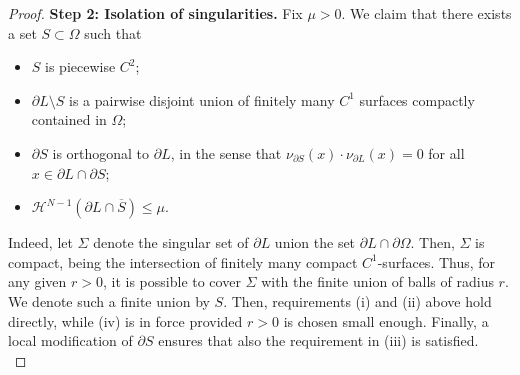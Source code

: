 \documentclass[a4paper, 11pt, reqno]{amsart}
\theoremstyle{plain}
\theoremstyle{definition}
\theoremstyle{remark}
\newcommand{\hno}{{\mathcal H}^{N-1}}
\begin{document}
\begin{proof}
\textbf{Step 2: Isolation of singularities.}
Fix $\mu>0$.
We claim that there exists a set $S\subset\Omega$ such that
\begin{itemize}
\item[(i)] $S$ is piecewise $C^2$;
\item[(ii)] $\partial L\setminus S$ is a pairwise disjoint union of finitely many $C^1$ surfaces compactly contained in $\Omega$;
\item[(iii)] $\partial S$ is orthogonal to $\partial L$, in the sense that $\nu_{\partial S}(x)\cdot\nu_{\partial L}(x)=0$ for all $x\in\partial L \cap \partial S$;
\item[(iv)] $\hno(\partial L\cap \overline{S})\leq \mu$.
\end{itemize}
Indeed, let $\Sigma$ denote the singular set of $\partial L$ union the set $\partial L \cap\partial\Omega$.
Then, $\Sigma$ is compact, being the intersection of finitely many compact $C^1$-surfaces.
Thus, for any given $r>0$, it is possible to cover $\Sigma$ with the finite union of balls of radius $r$.
We denote such a finite union by $S$.
Then, requirements (i) and (ii) above hold directly, while (iv) is in force provided $r>0$ is chosen small enough.
Finally, a local modification of $\partial S$ ensures that also the requirement in (iii) is satisfied.\\


\end{proof}
\end{document}
